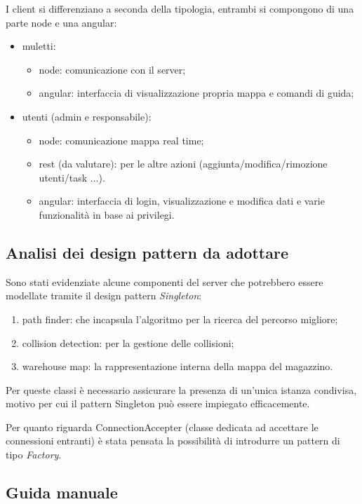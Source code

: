 I client si differenziano a seconda della tipologia, entrambi si compongono di una parte node e una angular:
\begin{itemize}
    \item muletti:
    \begin{itemize}
        \item node: comunicazione con il server;
        \item angular: interfaccia di visualizzazione propria mappa e comandi di guida;
    \end{itemize}
    \item utenti (admin e responsabile):
    \begin{itemize}
        \item node: comunicazione mappa real time;
        \item rest (da valutare): per le altre azioni (aggiunta/modifica/rimozione utenti/task ...).
        \item angular: interfaccia di login, visualizzazione e modifica dati e varie funzionalità in base ai privilegi.
    \end{itemize}
\end{itemize}

\subsection{Analisi dei design pattern da adottare}

Sono stati evidenziate alcune componenti del server che potrebbero essere modellate tramite il design pattern \textit{Singleton}:
\begin{enumerate}
	\item path finder: che incapsula l'algoritmo per la ricerca del percorso migliore;
	\item collision detection: per la gestione delle collisioni;
	\item warehouse map: la rappresentazione interna della mappa del magazzino.
\end{enumerate}

Per queste classi è necessario assicurare la presenza di un'unica istanza condivisa, motivo per cui il pattern Singleton può essere impiegato efficacemente.

Per quanto riguarda ConnectionAccepter (classe dedicata ad accettare le connessioni entranti) è stata pensata la possibilità di introdurre un pattern di tipo \textit{Factory}.

\subsection{Guida manuale}

